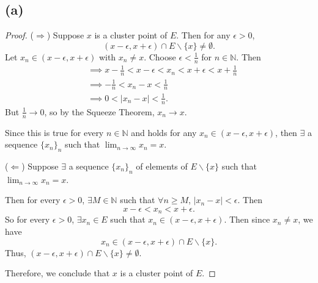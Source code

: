 \documentclass{article}
\begin{document}
\subsection*{(a)}
\begin{proof}
	($\Rightarrow$) Suppose $x$ is a cluster point of $E$. Then for any $\epsilon>0$,
	\begin{equation}
		(x-\epsilon, x+\epsilon)\cap E \backslash\{x\} \neq \emptyset.
	\end{equation}
	Let $x_n \in (x-\epsilon, x+\epsilon)$ with $x_n \neq x$. Choose $\epsilon<\frac{1}{n}$ for $n\in\mathbb{N}$. Then
	\begin{align}
		&\implies x-\frac{1}{n} < x-\epsilon<x_n<x+\epsilon<x+\frac{1}{n} \\
		&\implies -\frac{1}{n}<x_n-x<\frac{1}{n} \\
		&\implies 0 < |x_n - x| < \frac{1}{n}.
	\end{align}
	But $\frac{1}{n} \rightarrow 0$, so by the Squeeze Theorem, $x_n \rightarrow x$.
	
	Since this is true for every $n\in\mathbb{N}$  and holds for any $x_n\in(x-\epsilon, x+\epsilon)$, then $\exists$ a sequence $\{x_n\}_n$ such that $\lim_{n\to\infty}x_n=x$.
	
	($\Leftarrow$) Suppose $\exists$ a sequence $\{x_n\}_n$ of elements of $E\backslash\{x\}$ such that \\$\lim_{n\to\infty}x_n=x$. 
	
	Then for every $\epsilon>0$, $\exists M\in\mathbb{N}$ such that $\forall n\geq M$, $|x_n-x|<\epsilon$. Then
	\begin{equation}
		x-\epsilon<x_n<x+\epsilon.
	\end{equation}
	So for every $\epsilon>0$, $\exists x_n \in E$ such that $x_n \in (x-\epsilon, x+\epsilon)$. Then since $x_n \neq x$, we have
	\begin{equation}
		x_n \in (x-\epsilon, x+\epsilon)\cap E \backslash \{x\}.
	\end{equation}
	Thus, $(x-\epsilon, x+\epsilon)\cap E \backslash\{x\}\neq\emptyset$.
	
	Therefore, we conclude that $x$ is a cluster point of $E$.
\end{proof}
\end{document}
